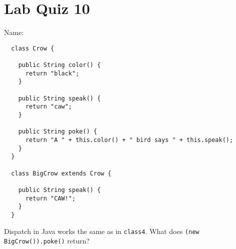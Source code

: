 \documentclass{article}
\begin{document}
\section*{Lab Quiz 10}

\bigskip
\bigskip
Name: \underline{\hspace*{4in}}

\bigskip
\setlength{\parskip}{8pt}

\begin{verbatim}
  class Crow {

    public String color() {
      return "black";
    }

    public String speak() {
      return "caw";
    }

    public String poke() {
      return "A " + this.color() + " bird says " + this.speak();
    }
  }

  class BigCrow extends Crow {

    public String speak() {
      return "CAW!";
    }
  }
\end{verbatim}

\bigskip

Dispatch in Java works the same as in \texttt{class4}. What does
\verb|(new BigCrow()).poke()| return?
\end{document}
